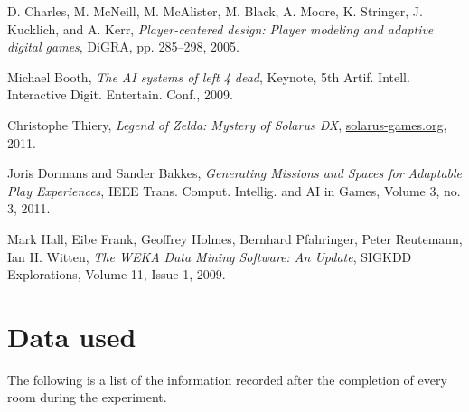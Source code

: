 \documentclass[a4paper]{article}
\begin{document}
\begin{multicols*}{2}

\begin{thebibliography}{9}

D. Charles, M. McNeill, M. McAlister, M. Black, A. Moore, K. Stringer, J. Kucklich, and A. Kerr, 
\emph{Player-centered design: Player modeling and
adaptive digital games},
DiGRA, pp. 285–298,
2005.

Michael Booth,
\emph{The AI systems of left 4 dead},
Keynote, 5th Artif. Intell. Interactive Digit. Entertain. Conf.,
2009.

Christophe Thiery,
\emph{Legend of Zelda: Mystery of Solarus DX},
\url{solarus-games.org},
2011.

Joris Dormans and Sander Bakkes,
\emph{Generating Missions and Spaces for
Adaptable Play Experiences},
{IEEE} Trans. Comput. Intellig. and {AI} in Games, Volume 3, no. 3,
2011.

Mark Hall, Eibe Frank, Geoffrey Holmes, Bernhard Pfahringer, Peter Reutemann, Ian H. Witten,
\emph{The WEKA Data Mining Software: An Update},
SIGKDD Explorations, Volume 11, Issue 1,
2009.

\end{thebibliography}
\end{multicols*}

\clearpage
\appendix
\section{Data used}
The following is a list of the information recorded after the completion of every room during the experiment.
\end{document}
